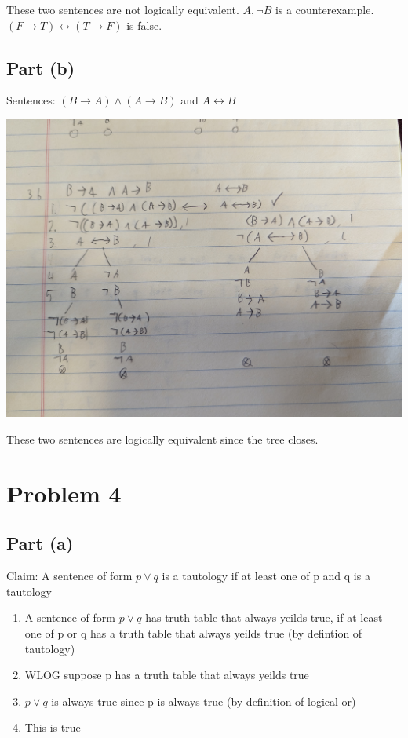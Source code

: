 \documentclass[12pt]{article}
\begin{document}
These two sentences are not logically equivalent. $A, \lnot B$ is a counterexample. $(F \rightarrow T) \leftrightarrow (T \rightarrow F)$ is false.


\subsection*{Part (b)}

Sentences: $(B \rightarrow A) \land (A \rightarrow B)$ and $A \leftrightarrow B$

\includegraphics[width=\textwidth]{3b}

These two sentences are logically equivalent since the tree closes. 

\section*{Problem 4}

\subsection*{Part (a)}

Claim: A sentence of form $p \lor q$ is a tautology if at least one of p and q is a tautology

\begin{enumerate}
    \item A sentence of form $p \lor q$ has truth table that always yeilds true, if at least one of p or q has a truth table that always yeilds true (by defintion of tautology)
    \item WLOG suppose p has a truth table that always yeilds true
    \item $p \lor q$ is always true since p is always true (by definition of logical or)
    \item This is true
\end{enumerate}
\end{document}
